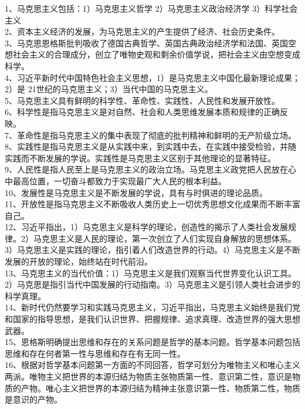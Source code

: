 \documentclass[a4paper,fleqn]{article}
\begin{document}
1、马克思主义包括：1）马克思主义哲学 2）马克思主义政治经济学 3）科学社会主义 \\
2、资本主义经济的发展，为马克思主义的产生提供了经济、社会历史条件。 \\
3、马克思恩格斯批判吸收了德国古典哲学、英国古典政治经济学和法国、英国空想社会主义的合理成分，创立了唯物史观和剩余价值学说，把社会主义由空想变成科学。 \\
4、习近平新时代中国特色社会主义思想，1）是马克思主义中国化最新理论成果；2）是 21世纪的马克思主义；3）当代中国的马克思主义。 \\
5、马克思主义具有鲜明的科学性、革命性、实践性、人民性和发展开放性。 \\
6、科学性是指马克思主义是对自然、社会和人类思维发展本质和规律的正确反映。 \\
7、革命性是指马克思主义的集中表现了彻底的批判精神和鲜明的无产阶级立场。 \\
8、实践性是指马克思主义是从实践中来，到实践中去，在实践中接受检验，并随实践而不断发展的学说。实践性是马克思主义区别于其他理论的显著特征。 \\
9、人民性是指人民至上是马克思主义的政治立场。马克思主义政党把人民放在心中最高位置，一切奋斗都致力于实现最广大人民的根本利益。 \\
10、发展性是马克思主义是不断发展的学说，具有与时俱进的理论品质。 \\
11、开放性是指马克思主义不断吸收人类历史上一切优秀思想文化成果而不断丰富自己。 \\
12、习近平指出，1）马克思主义是科学的理论，创造性的揭示了人类社会发展规律。2）马克思主义是人民的理论，第一次创立了人们实现自身解放的思想体系。3）马克思主义是实践的理论，指引着人们改造世界的行动。4）马克思主义是不断发展的开放的理论，始终站在时代前沿。 \\
13、马克思主义的当代价值：1）马克思主义是我们观察当代世界变化认识工具。2）马克思是指引当代中国发展的行动指南。3）马克思主义是引领人类社会进步的科学真理。 \\
14、新时代仍然要学习和实践马克思主义，习近平指出，马克思主义始终是我们党和国家的指导思想，是我们认识世界、把握规律、追求真理、改造世界的强大思想武器。 \\
15、恩格斯明确提出思维和存在的关系问题是哲学的基本问题。哲学基本问题包括思维和存在何者第一性与思维和存在有无同一性。 \\
16、根据对哲学基本问题第一方面的不同回答，哲学可划分为唯物主义和唯心主义两派。唯物主义把世界的本源归结为物质主张物质第一性、意识第二性，意识是物质的产物。唯心主义把世界的本源归结为精神主张意识第一性、物质第二性，物质是意识的产物。 \\
\end{document}
